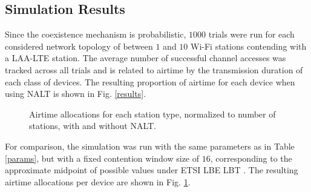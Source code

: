 \subsection{Simulation Results}
\label{sim-results}

Since the coexistence mechanism is probabilistic, $1000$ trials were run for each considered network topology of between $1$ and $10$ \mbox{Wi-Fi} stations contending with a \mbox{LAA-LTE} station.  The average number of successful channel accesses was tracked across all trials and is related to airtime by the transmission duration of each class of devices.  The resulting proportion of airtime for each device when using NALT is shown in Fig. \ref{results}.
\begin{figure}[t]
	\centering
	\hfil
	\caption{Airtime allocations for each station type, normalized to number of stations, with and without NALT.}
	\label{compresults}
\end{figure}
For comparison, the simulation was run with the same parameters as in Table \ref{params}, but with a fixed contention window size of $16$, corresponding to the approximate midpoint of possible values under ETSI LBE LBT \cite{3gpp}. The resulting airtime allocations per device are shown in Fig. \ref{compresults}.

